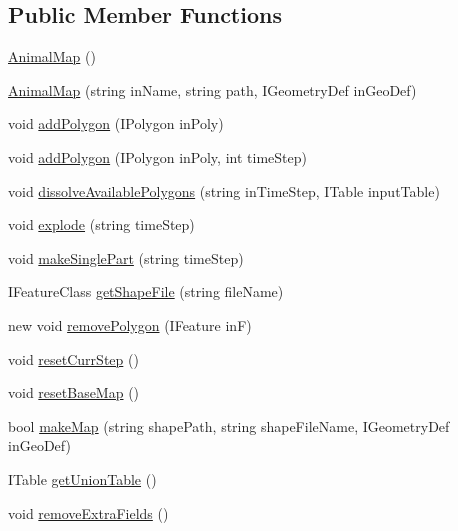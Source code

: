 \subsection*{Public Member Functions}
\begin{DoxyCompactItemize}
\item 
\hyperlink{class_p_a_z___dispersal_1_1_animal_map_a0048c2b793d6fea71d86fd22c54286fc}{Animal\-Map} ()
\item 
\hyperlink{class_p_a_z___dispersal_1_1_animal_map_a9416a95bd4315ccb828ee2bc1b4fc1c6}{Animal\-Map} (string in\-Name, string path, I\-Geometry\-Def in\-Geo\-Def)
\item 
void \hyperlink{class_p_a_z___dispersal_1_1_animal_map_a052724aa0a104dfe5f95a15320354b98}{add\-Polygon} (I\-Polygon in\-Poly)
\item 
void \hyperlink{class_p_a_z___dispersal_1_1_animal_map_ab4b2d7e6847f2effcf24ad35b8c2b645}{add\-Polygon} (I\-Polygon in\-Poly, int time\-Step)
\item 
void \hyperlink{class_p_a_z___dispersal_1_1_animal_map_a40dd6792448aecf4873c9333cdd9a9eb}{dissolve\-Available\-Polygons} (string in\-Time\-Step, I\-Table input\-Table)
\item 
void \hyperlink{class_p_a_z___dispersal_1_1_animal_map_a58128c631de711e7f7c3b5a3e2a13498}{explode} (string time\-Step)
\item 
void \hyperlink{class_p_a_z___dispersal_1_1_animal_map_adbd150a59a78abac1dff4d8a14f287c3}{make\-Single\-Part} (string time\-Step)
\item 
I\-Feature\-Class \hyperlink{class_p_a_z___dispersal_1_1_animal_map_a107840795d8877de04edf0312a08ab2c}{get\-Shape\-File} (string file\-Name)
\item 
new void \hyperlink{class_p_a_z___dispersal_1_1_animal_map_a297597aa45b2afc716bd4244512d427c}{remove\-Polygon} (I\-Feature in\-F)
\item 
void \hyperlink{class_p_a_z___dispersal_1_1_animal_map_a2e9bd5b0dc54d102d745a55622c53134}{reset\-Curr\-Step} ()
\item 
void \hyperlink{class_p_a_z___dispersal_1_1_animal_map_a524bf086faa7f5efd6863bb7cda7073b}{reset\-Base\-Map} ()
\item 
bool \hyperlink{class_p_a_z___dispersal_1_1_animal_map_a50b1f9f9b7d9ec2a97b9aed1cddf8fed}{make\-Map} (string shape\-Path, string shape\-File\-Name, I\-Geometry\-Def in\-Geo\-Def)
\item 
I\-Table \hyperlink{class_p_a_z___dispersal_1_1_animal_map_a2e5c3d5912456d8666c18cf0855791cf}{get\-Union\-Table} ()
\item 
void \hyperlink{class_p_a_z___dispersal_1_1_animal_map_aa896d3935d98ec334cdcd81dc9e5a777}{remove\-Extra\-Fields} ()
\end{DoxyCompactItemize}
